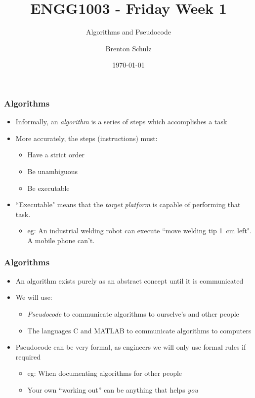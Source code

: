 \documentclass[14pt]{beamer}
\title{ENGG1003 - Friday Week 1}
\subtitle{Algorithms and Pseudocode}
\author{Brenton Schulz}
\institute{University of Newcastle}
\date{\today}
\begin{document}
\titlepage

\begin{frame} %
\frametitle{Algorithms}
\begin{itemize}
\item Informally, an \textit{algorithm} is a series of steps which accomplishes a task
\item More accurately, the steps (instructions) must:
	\begin{itemize}
		\item Have a strict order
		\item Be unambiguous
		\item Be executable
	\end{itemize}
\item ``Executable" means that the \textit{target platform} is capable of performing that task.
	\begin{itemize}
		\item eg: An industrial welding robot can execute ``move welding tip 1~cm left". A mobile phone can't.
	\end{itemize}
\end{itemize}
\end{frame}

\begin{frame} %
\frametitle{Algorithms}
\begin{itemize}
\item An algorithm exists purely as an abstract concept until it is communicated
\item We will use:
	\begin{itemize}
	\item \textit{Pseudocode} to communicate algorithms to ourselve's and other people
	\item The languages C and MATLAB to communicate algorithms to computers
	\end{itemize}
\item Pseudocode can be very formal, as engineers we will only use formal rules if required
	\begin{itemize}
		\item eg: When documenting algorithms for other people
		\item Your own ``working out'' can be anything that helps \textit{you}
	\end{itemize}
\end{itemize}
\end{frame}
\end{document}
